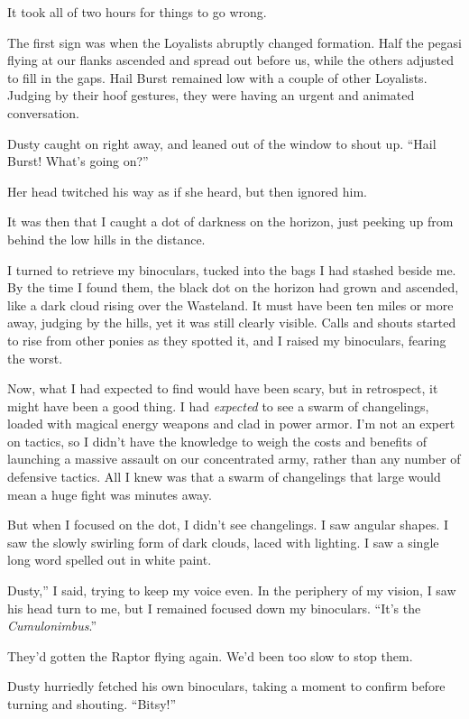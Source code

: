 It took all of two hours for things to go wrong.

The first sign was when the Loyalists abruptly changed formation. Half the pegasi flying at our flanks ascended and spread out before us, while the others adjusted to fill in the gaps. Hail Burst remained low with a couple of other Loyalists. Judging by their hoof gestures, they were having an urgent and animated conversation.

Dusty caught on right away, and leaned out of the window to shout up. “Hail Burst! What’s going on?”

Her head twitched his way as if she heard, but then ignored him.

It was then that I caught a dot of darkness on the horizon, just peeking up from behind the low hills in the distance.

I turned to retrieve my binoculars, tucked into the bags I had stashed beside me. By the time I found them, the black dot on the horizon had grown and ascended, like a dark cloud rising over the Wasteland. It must have been ten miles or more away, judging by the hills, yet it was still clearly visible. Calls and shouts started to rise from other ponies as they spotted it, and I raised my binoculars, fearing the worst.

Now, what I had expected to find would have been scary, but in retrospect, it might have been a good thing. I had \textit{expected} to see a swarm of changelings, loaded with magical energy weapons and clad in power armor. I’m not an expert on tactics, so I didn’t have the knowledge to weigh the costs and benefits of launching a massive assault on our concentrated army, rather than any number of defensive tactics. All I knew was that a swarm of changelings that large would mean a huge fight was minutes away.

But when I focused on the dot, I didn’t see changelings. I saw angular shapes. I saw the slowly swirling form of dark clouds, laced with lighting. I saw a single long word spelled out in white paint.

\leavevmode{}Dusty,” I said, trying to keep my voice even. In the periphery of my vision, I saw his head turn to me, but I remained focused down my binoculars. “It’s the \textit{Cumulonimbus}.”

They’d gotten the Raptor flying again. We’d been too slow to stop them.

Dusty hurriedly fetched his own binoculars, taking a moment to confirm before turning and shouting. “Bitsy!”

